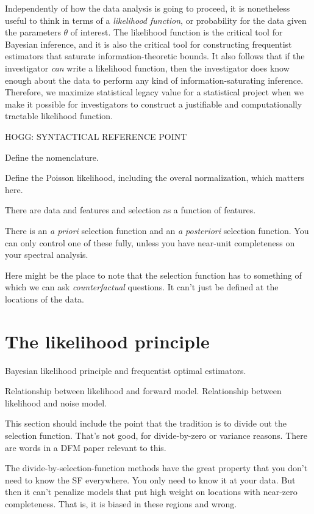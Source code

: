 \documentclass[modern]{aastex62}
\newcommand{\foreign}[1]{\textsl{#1}}
\begin{document}
Independently of how the data analysis is going to proceed, it is nonetheless
useful to think in
terms of a \emph{likelihood function}, or probability for the data given
the parameters $\theta$ of interest.
The likelihood function is the critical tool for Bayesian inference, and
it is also the critical tool for constructing frequentist estimators that
saturate information-theoretic bounds.
It also follows that if the investigator \emph{can} write a likelihood
function, then the investigator does know enough about the data to perform
any kind of information-saturating inference.
Therefore, we maximize statistical legacy value for a statistical project
when we make it possible for investigators to construct a justifiable and
computationally tractable likelihood function.

HOGG: SYNTACTICAL REFERENCE POINT

Define the nomenclature.

Define the Poisson likelihood, including the overal normalization, which matters here.

There are data and features and selection as a function of features.

There is an \foreign{a priori} selection function and an \foreign{a posteriori}
selection function. You can only control one of these fully, unless you have near-unit
completeness on your spectral analysis.

Here might be the place to note that the selection function has to something of
which we can ask \emph{counterfactual} questions. It can't just be defined at
the locations of the data.

\section{The likelihood principle}

Bayesian likelihood principle and frequentist optimal estimators.

Relationship between likelihood and forward model. Relationship between
likelihood and noise model.

This section should include the point that the tradition is to divide out
the selection function. That's not good, for divide-by-zero or variance
reasons. There are words in a DFM paper relevant to this.

The divide-by-selection-function methods have the great property that you don't need
to know the SF everywhere. You only need to know it at your data. But then
it can't penalize models that put high weight on locations with near-zero
completeness. That is, it is biased in these regions and wrong.
\end{document}

